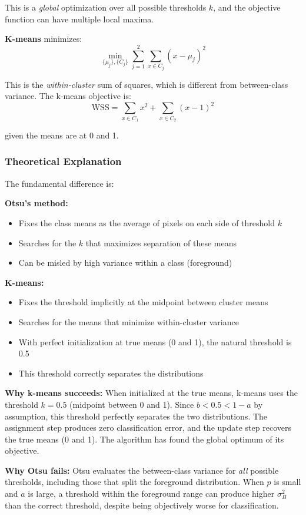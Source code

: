 \documentclass[11pt,a4paper]{article}
\begin{document}
This is a \textit{global} optimization over all possible thresholds $k$, and the objective function can have multiple local maxima.

\textbf{K-means} minimizes:
$$\min_{\{\mu_j\}, \{C_j\}} \sum_{j=1}^2 \sum_{x \in C_j} (x - \mu_j)^2$$

This is the \textit{within-cluster} sum of squares, which is different from between-class variance. The k-means objective is:
$$\text{WSS} = \sum_{x \in C_1} x^2 + \sum_{x \in C_2} (x-1)^2$$

given the means are at 0 and 1.

\subsubsection{Theoretical Explanation}

The fundamental difference is:

\textbf{Otsu's method:}
\begin{itemize}
    \item Fixes the class means as the average of pixels on each side of threshold $k$
    \item Searches for the $k$ that maximizes separation of these means
    \item Can be misled by high variance within a class (foreground)
\end{itemize}

\textbf{K-means:}
\begin{itemize}
    \item Fixes the threshold implicitly at the midpoint between cluster means
    \item Searches for the means that minimize within-cluster variance
    \item With perfect initialization at true means (0 and 1), the natural threshold is 0.5
    \item This threshold correctly separates the distributions
\end{itemize}

\textbf{Why k-means succeeds:} When initialized at the true means, k-means uses the threshold $k = 0.5$ (midpoint between 0 and 1). Since $b < 0.5 < 1-a$ by assumption, this threshold perfectly separates the two distributions. The assignment step produces zero classification error, and the update step recovers the true means (0 and 1). The algorithm has found the global optimum of its objective.

\textbf{Why Otsu fails:} Otsu evaluates the between-class variance for \textit{all} possible thresholds, including those that split the foreground distribution. When $p$ is small and $a$ is large, a threshold within the foreground range can produce higher $\sigma_B^2$ than the correct threshold, despite being objectively worse for classification.
\end{document}
